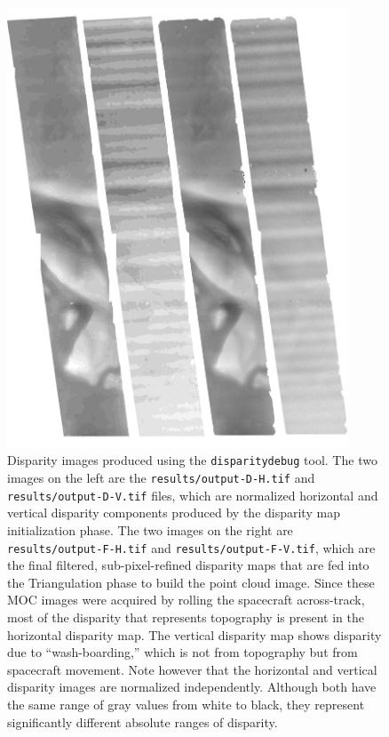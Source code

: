 \begin{figure}[b!]
\begin{minipage}{4in}
\includegraphics[width=4in]{images/p19-disparity.png}
\end{minipage}
\hfill
\begin{minipage}{2.7in}
\caption[P19 disparity images]{
    \label{p19-disparity}
	Disparity images produced using the \texttt{disparitydebug}
        tool.  The two images on the left are the
        \texttt{results/output-D-H.tif} and
        \texttt{results/output-D-V.tif} files, which are normalized
        horizontal and vertical disparity components produced by the
        disparity map initialization phase.  The two images on the
        right are \texttt{results/output-F-H.tif} and
        \texttt{results/output-F-V.tif}, which are the final
        filtered, sub-pixel-refined disparity maps that are fed into the
        Triangulation phase to build the point cloud image.  Since
        these MOC images were acquired by rolling the spacecraft
        across-track, most of the disparity that represents topography
        is present in the horizontal disparity map.  The vertical
        disparity map shows disparity due to ``wash-boarding,'' which
        is not from topography but from spacecraft movement. Note
        however that the horizontal and vertical disparity images are
        normalized independently.  Although both have the same range
        of gray values from white to black, they represent
        significantly different absolute ranges of disparity.}
\end{minipage}
\end{figure}

